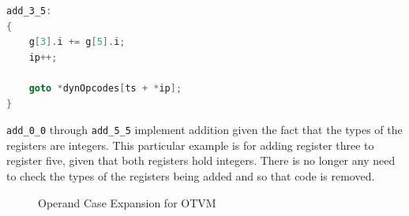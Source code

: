 \documentclass[english,a4paper,12pt]{report}
\begin{document}
\begin{lstlisting}[language=C]
add_3_5:
{
    g[3].i += g[5].i;
    ip++;

    goto *dynOpcodes[ts + *ip];
}
\end{lstlisting}

\verb|add_0_0| through \verb|add_5_5| implement addition given the fact
that the types of the registers are integers. This particular example
is for adding register three to register five, given that both
registers hold integers. There is no longer any need to check the
types of the registers being added and so that code is removed.

\begin{figure}[!htb]
	\centering
	\caption{Operand Case Expansion for OTVM}
	\label{fig:op-case-expansion-implementation-2}	
\end{figure}
\end{document}
